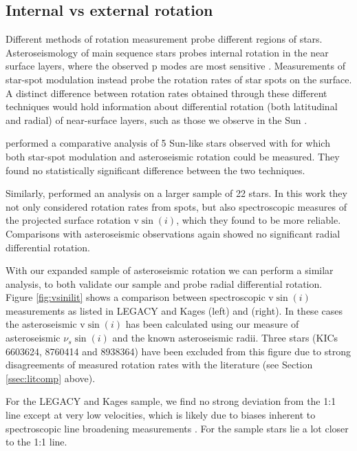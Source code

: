 \subsection{Internal vs external rotation}
Different methods of rotation measurement probe different regions of stars. Asteroseismology of main sequence stars probes internal rotation in the near surface layers, where the observed p modes are most sensitive \cite{lund+2014}. Measurements of star-spot modulation instead probe the rotation rates of star spots on the surface. A distinct difference between rotation rates obtained through these different techniques would hold information about differential rotation (both latitudinal and radial) of near-surface layers, such as those we observe in the Sun \cite{beck2000}. 

\cite{nielsen+2015} performed a comparative analysis of 5 Sun-like stars observed with \kepler for which both star-spot modulation and asteroseismic rotation could be measured. They found no statistically significant difference between the two techniques.

Similarly, \cite{benomar+2015} performed an analysis on a larger sample of 22 stars. In this work they not only considered rotation rates from spots, but also spectroscopic measures of the projected surface rotation $\textrm{v}\sin(i)$, which they found to be more reliable. Comparisons with asteroseismic observations again showed no significant radial differential rotation.

With our expanded sample of asteroseismic rotation we can perform a similar analysis, to both validate our sample and probe radial differential rotation. Figure \ref{fig:vsinilit} shows a comparison between spectroscopic $\textrm{v}\sin(i)$ measurements as listed in LEGACY and Kages (left) and \cite{benomar+2015} (right). In these cases the asteroseismic $\textrm{v}\sin(i)$ has been calculated using our measure of asteroseismic $\nu_s\sin(i)$ and the known asteroseismic radii. Three stars (KICs 6603624, 8760414 and 8938364) have been excluded from this figure due to strong disagreements of measured rotation rates with the literature (see Section \ref{ssec:litcomp} above).

For the LEGACY and Kages sample, we find no strong deviation from the 1:1 line except at very low velocities, which is likely due to biases inherent to spectroscopic line broadening measurements \cite{doyle+2014, tayar+2015}. For the \cite{benomar+2015} sample stars lie a lot closer to the 1:1 line.


